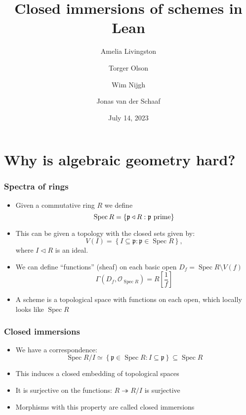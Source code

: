 \documentclass{beamer}
\title{Closed immersions of schemes in Lean}
\author{Amelia Livingston \and Torger Olson \and Wim Nijgh \and Jonas van der Schaaf}
\date{July 14, 2023}
\newcommand{\sheaf}{\mathcal{O}}
\newcommand{\primeid}{\mathfrak{p}}
\newcommand{\setwith}[2]{\left\{#1:#2\right\}}
\DeclareMathOperator{\spec}{Spec}
\newcommand{\ideal}{\triangleleft}
\begin{document}
\maketitle

\section{Why is algebraic geometry hard?}

\begin{frame}
    \frametitle{Spectra of rings}

    \begin{itemize}
        \item Given a commutative ring \(R\) we define
              \[
                  \spec R=\setwith{\primeid\ideal R}{\textnormal{\(\primeid\) prime}}
              \]
        \item This can be given a topology with the closed sets given by:
              \[
                  V(I)=\setwith{I\subseteq \primeid}{\primeid \in \spec R},
              \]
        where $I\ideal R$ is an ideal. 
        \item We can define ``functions'' (sheaf) on each basic open \(D_{f}=\spec
              R\setminus V(f)\)
              \[
                  \Gamma(D_{f},\sheaf_{\spec R})=R\left[\frac{1}{f}\right]
              \]
        \item A scheme is a topological space with functions on each open, which
              locally looks like $\spec R$
    \end{itemize}

\end{frame}

\begin{frame}
    \frametitle{Closed immersions}

    \begin{itemize}
        \item We have a correspondence:
              \[
                  \spec R/I\simeq\setwith{\primeid\in\spec R}{I\subseteq\primeid}\subseteq\spec R
              \]

        \item This induces a closed embedding of topological spaces

        \item It is surjective on the functions: \(R\twoheadrightarrow R/I\) is
              surjective

        \item Morphisms with this property are called closed immersions
    \end{itemize}

\end{frame}
\end{document}
